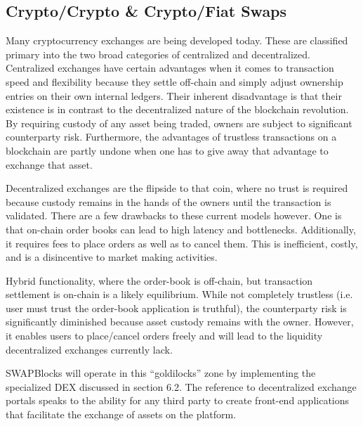 \documentclass[12pt]{article}
\begin{document}
\subsection{Crypto/Crypto \& Crypto/Fiat Swaps}
Many cryptocurrency exchanges are being developed today. These are classified primary into the two broad categories of 
centralized and decentralized. Centralized exchanges have certain advantages when it comes to transaction speed and 
flexibility because they settle off-chain and simply adjust ownership entries on their own internal ledgers. Their 
inherent disadvantage is that their existence is in contrast to the decentralized nature of the blockchain revolution.
By requiring custody of any asset being traded, owners are subject to significant counterparty risk. Furthermore, the 
advantages of trustless transactions on a blockchain are partly undone when one has to give away that advantage to exchange 
that asset.

Decentralized exchanges are the flipside to that coin, where no trust is required because custody remains in 
the hands of the owners until the transaction is validated. There are a few drawbacks to these current models 
however. One is that on-chain order books can lead to high latency and bottlenecks. Additionally, it requires 
fees to place orders as well as to cancel them. This is inefficient, costly, and is a disincentive to market making activities. 

Hybrid functionality, where the order-book is off-chain, but transaction settlement is on-chain is a likely equilibrium. 
While not completely trustless (i.e. user must trust the order-book application is truthful), the counterparty risk is 
significantly diminished because asset custody remains with the owner. However, it enables users to place/cancel orders 
freely and will lead to the liquidity decentralized exchanges currently lack.

SWAPBlocks will operate in this “goldilocks” zone by implementing the specialized DEX discussed in section 6.2. The reference 
to decentralized exchange portals speaks to the ability for any third party to create front-end applications that facilitate 
the exchange of assets on the platform.
\end{document}
